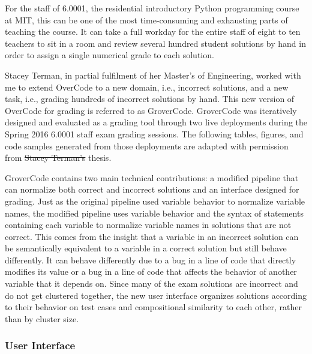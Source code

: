 \documentclass[12pt,twoside]{mitthesis}
\providecommand{\DIFaddtex}[1]{{\protect\color{blue}\uwave{#1}}} %
\providecommand{\DIFdeltex}[1]{{\protect\color{red}\sout{#1}}}                      %
\providecommand{\DIFaddbegin}{} %
\providecommand{\DIFaddend}{} %
\providecommand{\DIFdelbegin}{} %
\providecommand{\DIFdelend}{} %
\providecommand{\DIFadd}[1]{\texorpdfstring{\DIFaddtex{#1}}{#1}} %
\providecommand{\DIFdel}[1]{\texorpdfstring{\DIFdeltex{#1}}{}} %
\begin{document}
For the staff of 6.0001, the residential introductory Python programming course at MIT, this can be one of the most time-consuming and exhausting parts of teaching the course. It can take a full workday for the entire staff of eight to ten teachers to sit in a room and review several hundred student solutions by hand in order to assign a single numerical grade to each solution.

Stacey Terman, in partial fulfilment of her Master's of Engineering, worked with me to extend OverCode to a new domain, i.e., incorrect solutions, and a new task, i.e., grading hundreds of incorrect solutions by hand\DIFaddbegin \DIFadd{~\mbox{%
\cite{staceythesis}}%
}\DIFaddend . This new version of OverCode for grading is referred to as GroverCode. GroverCode was iteratively designed and evaluated as a grading tool through two live deployments during the Spring 2016 6.0001 staff exam grading sessions. The following tables, figures, and code samples generated from those deployments are adapted with permission from \DIFdelbegin \DIFdel{Stacey Terman's }\DIFdelend \DIFaddbegin \DIFadd{that }\DIFaddend thesis.

GroverCode contains two main technical contributions: a modified pipeline that can normalize both correct and incorrect solutions and an interface designed for grading. Just as the original pipeline used variable behavior to normalize variable names, the modified pipeline uses variable behavior and the syntax of statements containing each variable to normalize variable names in solutions that are not correct. This comes from the insight that a variable in an incorrect solution can be semantically equivalent to a variable in a correct solution but still behave differently. It can behave differently due to a bug in a line of code that directly modifies its value or a bug in a line of code that affects the behavior of another variable that it depends on. Since many of the exam solutions are incorrect and do not get clustered together, the new user interface organizes solutions according to their behavior on test cases and compositional similarity to each other, rather than by cluster size.

\subsubsection{User Interface}
\end{document}
